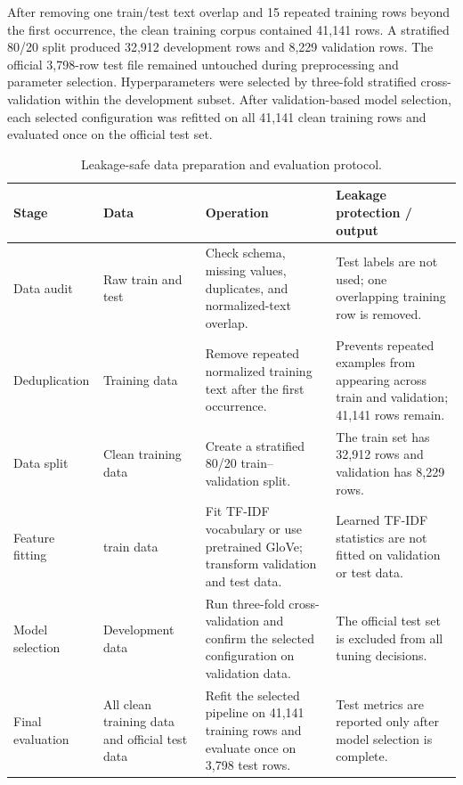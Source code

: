 After removing one train/test text overlap and 15 repeated training rows beyond the first occurrence, the clean training corpus contained 41,141 rows. A stratified 80/20 split produced 32,912 development rows and 8,229 validation rows. The official 3,798-row test file remained untouched during preprocessing and parameter selection. Hyperparameters were selected by three-fold stratified cross-validation within the development subset. After validation-based model selection, each selected configuration was refitted on all 41,141 clean training rows and evaluated once on the official test set.

\begin{table}[H]
\centering
\small
\setlength{\tabcolsep}{4pt}
\renewcommand{\arraystretch}{1.2}
\begin{tabularx}{\textwidth}{|>{\raggedright\arraybackslash}p{2.4cm}|>{\raggedright\arraybackslash}p{3.2cm}|X|X|}
\hline
\textbf{Stage} & \textbf{Data} & \textbf{Operation} & \textbf{Leakage protection / output} \\
\hline
Data audit & Raw train and test & Check schema, missing values, duplicates, and normalized-text overlap. & Test labels are not used; one overlapping training row is removed. \\
\hline
Deduplication & Training data & Remove repeated normalized training text after the first occurrence. & Prevents repeated examples from appearing across train and validation; 41,141 rows remain. \\
\hline
Data split & Clean training data & Create a stratified 80/20 train--validation split. & The train set has 32,912 rows and validation has 8,229 rows. \\
\hline
Feature fitting & train data & Fit TF-IDF vocabulary or use pretrained GloVe; transform validation and test data. & Learned TF-IDF statistics are not fitted on validation or test data. \\
\hline
Model selection & Development data & Run three-fold cross-validation and confirm the selected configuration on validation data. & The official test set is excluded from all tuning decisions. \\
\hline
Final evaluation & All clean training data and official test data & Refit the selected pipeline on 41,141 training rows and evaluate once on 3,798 test rows. & Test metrics are reported only after model selection is complete. \\
\hline
\end{tabularx}
\caption{Leakage-safe data preparation and evaluation protocol.}
\label{tab:leakage-protocol}
\end{table}

